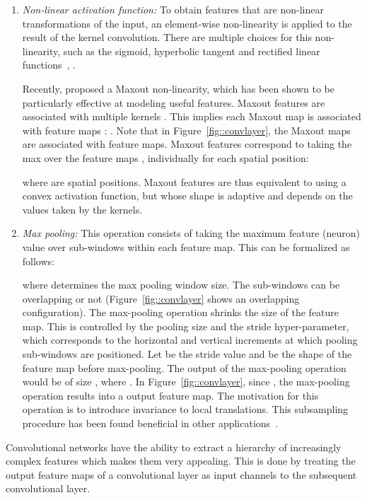 \documentclass[final,5p,times,twocolumn]{elsarticle}
\begin{document}
\begin{enumerate}
\item {\it Non-linear activation function:} To obtain features that are non-linear transformations of the input, an element-wise non-linearity is applied to the result of the kernel convolution. There are multiple choices for this non-linearity, such as the sigmoid, hyperbolic tangent and rectified linear functions~\citep{jarrett2009}, \citep{glorot2011}. 

Recently, \citet{Goodfellow_maxout_2013} proposed a Maxout non-linearity, which has been shown to be particularly effective at modeling useful features. Maxout features are associated with multiple kernels .  This implies each Maxout map  is associated with  feature maps : . Note that in Figure~\ref{fig::convlayer}, the Maxout maps are associated with  feature maps.  Maxout features correspond to taking the max over the feature maps , individually for each spatial position:


where  are spatial positions. Maxout features are thus equivalent to using a convex activation function, but whose shape is adaptive and depends on the values taken by the kernels.


\item {\it Max pooling:} This operation consists of taking the maximum feature (neuron) value over sub-windows within each feature map. This can be formalized as follows:
 
where  determines the max pooling window size.  The sub-windows can be overlapping or not (Figure~\ref{fig::convlayer} shows an overlapping configuration). The max-pooling operation shrinks the size of the feature map. This is controlled by the pooling size  and the stride hyper-parameter, which corresponds to the horizontal and vertical increments at which pooling sub-windows are positioned. Let  be the stride value and  be the shape of the feature map before max-pooling. The output of the max-pooling operation would be of size , where .  In Figure~\ref{fig::convlayer}, since , the max-pooling operation results into a  output feature map.
The motivation for this operation is to introduce invariance to local translations. This subsampling procedure has been found beneficial in other applications~\citep{Krizhevsky-2012-small}. 


\end{enumerate}



Convolutional networks have the ability to extract a hierarchy of increasingly complex features which makes them very appealing. This is done by treating the output feature maps of a convolutional layer as input channels to the subsequent convolutional layer. 
\end{document}
